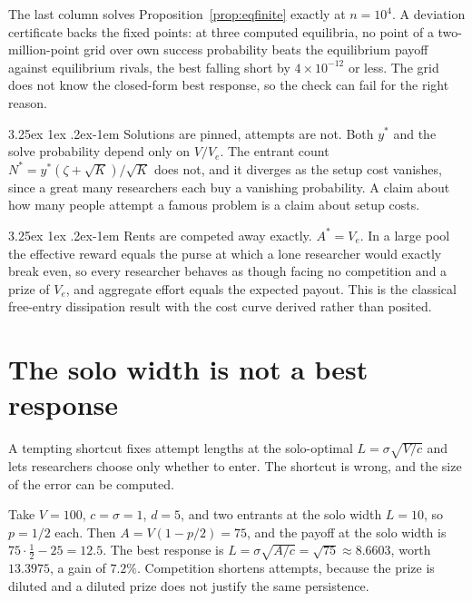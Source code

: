 \documentclass[11pt]{article}
\makeatletter
\renewcommand\paragraph{\@startsection{paragraph}{4}{\z@}%
  {3.25ex \@plus1ex \@minus.2ex}{-1em}%
  {\normalfont\normalsize\itshape}}
\theoremstyle{itheads}
\makeatother
\begin{document}
The last column solves Proposition~\ref{prop:eqfinite} exactly at
$n=10^{4}$. A deviation certificate backs the fixed points: at three
computed equilibria, no point of a two-million-point grid over own success
probability beats the equilibrium payoff against equilibrium rivals, the
best falling short by $4\times10^{-12}$ or less. The grid does not know the
closed-form best response, so the check can fail for the right reason.

\paragraph{Solutions are pinned, attempts are not.}
Both $y^{*}$ and the solve probability depend only on $V/V_{e}$. The
entrant count $N^{*}=y^{*}(\zeta+\sqrt K)/\sqrt K$ does not, and it
diverges as the setup cost vanishes, since a great many researchers each
buy a vanishing probability. A claim about how many people attempt a
famous problem is a claim about setup costs.

\paragraph{Rents are competed away exactly.}
$A^{*}=V_{e}$. In a large pool the effective reward equals the purse at
which a lone researcher would exactly break even, so every researcher
behaves as though facing no competition and a prize of $V_{e}$, and
aggregate effort equals the expected payout. This is the classical
free-entry dissipation result with the cost curve derived rather than
posited.

\section{The solo width is not a best response}
\label{sec:committed}

A tempting shortcut fixes attempt lengths at the solo-optimal
$L=\sigma\sqrt{V/c}$ and lets researchers choose only whether to enter.
The shortcut is wrong, and the size of the error can be computed.

Take $V=100$, $c=\sigma=1$, $d=5$, and two entrants at the solo width
$L=10$, so $p=1/2$ each. Then $A=V(1-p/2)=75$, and the payoff at the solo
width is $75\cdot\tfrac12-25=12.5$. The best response is
$L=\sigma\sqrt{A/c}=\sqrt{75}\approx8.6603$, worth $13.3975$, a gain of
$7.2\%$. Competition shortens attempts, because the prize is diluted and a
diluted prize does not justify the same persistence.
\end{document}
